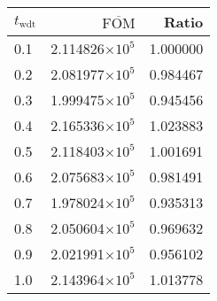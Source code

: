 \begin{tabular}{lrr}
\toprule
$t_{\mathrm{wdt}}$ & $\overline{\mathrm{FOM}}$ &    Ratio \\
\midrule
               0.1 &   2.114826$\times 10^{5}$ & 1.000000 \\
               0.2 &   2.081977$\times 10^{5}$ & 0.984467 \\
               0.3 &   1.999475$\times 10^{5}$ & 0.945456 \\
               0.4 &   2.165336$\times 10^{5}$ & 1.023883 \\
               0.5 &   2.118403$\times 10^{5}$ & 1.001691 \\
               0.6 &   2.075683$\times 10^{5}$ & 0.981491 \\
               0.7 &   1.978024$\times 10^{5}$ & 0.935313 \\
               0.8 &   2.050604$\times 10^{5}$ & 0.969632 \\
               0.9 &   2.021991$\times 10^{5}$ & 0.956102 \\
               1.0 &   2.143964$\times 10^{5}$ & 1.013778 \\
\bottomrule
\end{tabular}
